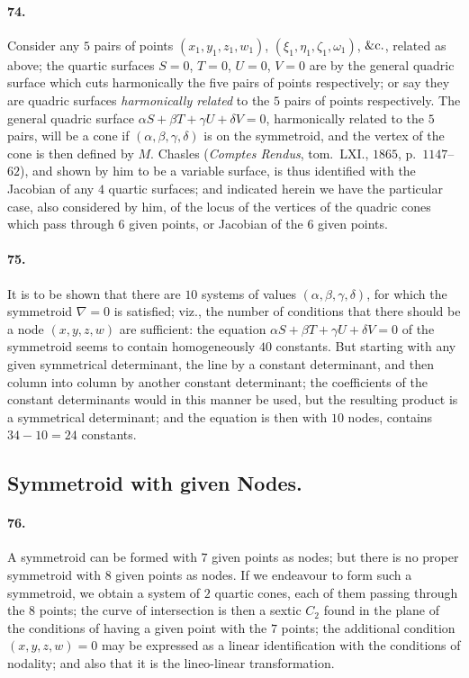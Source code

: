 \documentclass[11pt,a4paper]{article}
\begin{document}
\medskip

\paragraph{74.}
Consider any $5$ pairs of points $(x_1, y_1, z_1, w_1)$, $(\xi_1, \eta_1, \zeta_1, \omega_1)$,
$\&{\rm c}.$, related as above; the quartic surfaces $S = 0$, $T = 0$, $U = 0$, $V = 0$
are by the general quadric surface which cuts harmonically the five pairs of points
respectively; or say they are quadric surfaces \textit{harmonically related} to the
$5$ pairs of points respectively. The general quadric surface
$\alpha S + \beta T + \gamma U + \delta V = 0$, harmonically related to the $5$
pairs, will be a cone if $(\alpha, \beta, \gamma, \delta)$ is on the symmetroid, and
the vertex of the cone is then defined by $M.$ Chasles (\textit{Comptes Rendus},
tom.\ LXI., $1865$, p.\ $1147$--$62$), and shown by him to be a variable surface, is
thus identified with the Jacobian of any $4$ quartic surfaces; and indicated herein
we have the particular case, also considered by him, of the locus of the vertices
of the quadric cones which pass through $6$ given points, or Jacobian of the $6$
given points.

\medskip

\paragraph{75.}
It is to be shown that there are $10$ systems of values $(\alpha, \beta, \gamma, \delta)$,
for which the symmetroid $\nabla = 0$ is satisfied; viz., the number of conditions
that there should be a node $(x, y, z, w)$ are sufficient: the equation
$\alpha S + \beta T + \gamma U + \delta V = 0$ of the symmetroid seems to contain
homogeneously $40$ constants. But starting with any given symmetrical determinant,
the line by a constant determinant, and then column into column by another constant
determinant; the coefficients of the constant determinants would in this manner be
used, but the resulting product is a symmetrical determinant; and the equation is
then with $10$ nodes, contains $34 - 10 = 24$ constants.

\bigskip

\subsection*{Symmetroid with given Nodes.}

\paragraph{76.}
A symmetroid can be formed with $7$ given points as nodes; but there is no proper
symmetroid with $8$ given points as nodes. If we endeavour to form such a
symmetroid, we obtain a system of $2$ quartic cones, each of them passing through
the $8$ points; the curve of intersection is then a sextic $C_2$ found in the plane
of the conditions of having a given point with the $7$ points; the additional
condition $(x, y, z, w) = 0$ may be expressed as a linear identification with the
conditions of nodality; and also that it is the lineo-linear transformation.
\end{document}
